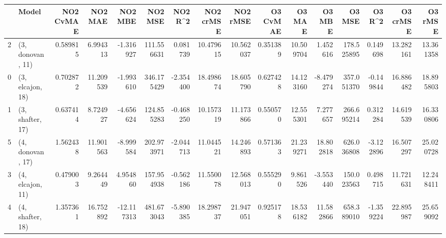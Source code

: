 \begin{tabular}{llrrrrrrrrrrrrrr}
\toprule
{} &             Model &  NO2 CvMAE &    NO2 MAE &    NO2 MBE &     NO2 MSE &   NO2 R\textasciicircum2 &  NO2 crMSE &   NO2 rMSE &  O3 CvMAE &     O3 MAE &     O3 MBE &      O3 MSE &    O3 R\textasciicircum2 &   O3 crMSE &    O3 rMSE \\
\midrule
2 &  (3, donovan, 11) &   0.589815 &   6.994313 &  -1.316927 &  111.556631 &  0.081739 &  10.479615 &  10.562037 &  0.351389 &  10.509704 &   1.452616 &  178.525895 &  0.149698 &  13.282161 &  13.361358 \\
0 &  (3, elcajon, 18) &   0.702872 &  11.209539 &  -1.993610 &  346.175429 & -2.354400 &  18.498674 &  18.605790 &  0.627428 &  14.123160 &  -8.479274 &  357.051370 & -0.149844 &  16.886482 &  18.895803 \\
1 &  (3, shafter, 17) &   0.637414 &   8.724927 &  -4.656624 &  124.855283 & -0.468250 &  10.157319 &  11.173866 &  0.550570 &  12.555301 &   7.277657 &  266.695214 &  0.312284 &  14.619539 &  16.330806 \\
5 &  (4, donovan, 17) &   1.562438 &  11.901563 &  -8.999584 &  202.973971 & -2.044713 &  11.044521 &  14.246893 &  0.571363 &  21.239271 &  18.802818 &  626.036808 & -3.122896 &  16.507297 &  25.020728 \\
3 &  (4, elcajon, 11) &   0.479003 &   9.264449 &   4.954860 &  157.954938 & -0.562186 &  11.550078 &  12.568013 &  0.555290 &   9.861526 &  -3.553440 &  150.023563 &  0.498715 &  11.721631 &  12.248411 \\
4 &  (4, shafter, 18) &   1.357361 &  16.752892 & -12.117313 &  481.673043 & -5.890385 &  18.298737 &  21.947051 &  0.925178 &  18.536182 &  11.582866 &  658.389010 & -1.359224 &  22.895987 &  25.659092 \\
\bottomrule
\end{tabular}
